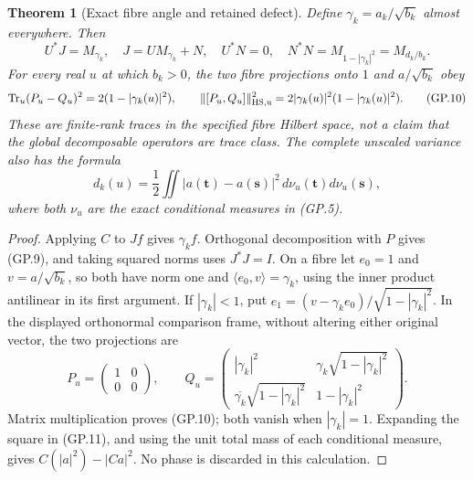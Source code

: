 \documentclass[11pt]{article}
\newtheorem{theorem}{Theorem}
\begin{document}
\begin{theorem}[Exact fibre angle and retained defect]
Define $\gamma_k=a_k/\sqrt{b_k}$ almost everywhere. Then
\begin{equation}
 U^*J=M_{\gamma_k},\quad
 J=UM_{\gamma_k}+N,\quad U^*N=0,\quad
 N^*N=M_{1-|\gamma_k|^2}=M_{d_k/b_k}.
 \tag{GP.9}
\end{equation}
For every real $u$ at which $b_k>0$, the two fibre projections onto
$1$ and $a/\sqrt{b_k}$ obey
\begin{equation}
 \operatorname{Tr}_{u}(P_u-Q_u)^2=2(1-|\gamma_k(u)|^2),\qquad
 \|[P_u,Q_u]\|_{\rm HS,u}^2
       =2|\gamma_k(u)|^2(1-|\gamma_k(u)|^2).
 \tag{GP.10}
\end{equation}
These are finite-rank traces in the specified fibre Hilbert space,
not a claim that the global decomposable operators are trace class.
The complete unscaled variance also has the formula
\begin{equation}
 d_k(u)=\frac12\iint|a(\mathbf t)-a(\mathbf s)|^2
                       \,d\nu_u(\mathbf t)d\nu_u(\mathbf s),
 \tag{GP.11}
\end{equation}
where both $\nu_u$ are the exact conditional measures in (GP.5).
\end{theorem}
\begin{proof}
Applying $C$ to $Jf$ gives $\gamma_k f$. Orthogonal decomposition
with $P$ gives (GP.9), and taking squared norms uses $J^*J=I$.
On a fibre let $e_0=1$ and $v=a/\sqrt{b_k}$, so both have norm
one and $\langle e_0,v\rangle=\gamma_k$, using the inner product
antilinear in its first argument. If $|\gamma_k|<1$, put
$e_1=(v-\gamma_ke_0)/\sqrt{1-|\gamma_k|^2}$. In the displayed
orthonormal comparison frame, without altering either original
vector, the two projections are
\[
 P_u=\begin{pmatrix}1&0\\0&0\end{pmatrix},\qquad
 Q_u=\begin{pmatrix}
 |\gamma_k|^2&\gamma_k\sqrt{1-|\gamma_k|^2}\\
 \overline{\gamma_k}\sqrt{1-|\gamma_k|^2}&1-|\gamma_k|^2
 \end{pmatrix}.
\]
Matrix multiplication proves (GP.10); both vanish when
$|\gamma_k|=1$. Expanding the square in (GP.11), and using the
unit total mass of each conditional measure, gives
$C(|a|^2)-|Ca|^2$. No phase is discarded in this calculation.
\end{proof}
\end{document}

